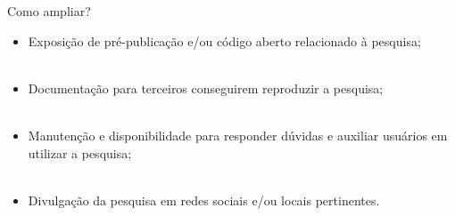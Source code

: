 \begin{frame}{Como ampliar?}
	\justify 
	\begin{itemize}
		\item Exposição de pré-publicação e/ou código aberto relacionado à pesquisa;
		\\~\\
		\item Documentação para terceiros conseguirem reproduzir a pesquisa;
		\\~\\
		\item Manutenção e disponibilidade para responder dúvidas e auxiliar usuários em utilizar a pesquisa;
		\\~\\
		\item Divulgação da pesquisa em redes sociais e/ou locais pertinentes.
	\end{itemize}
\end{frame}